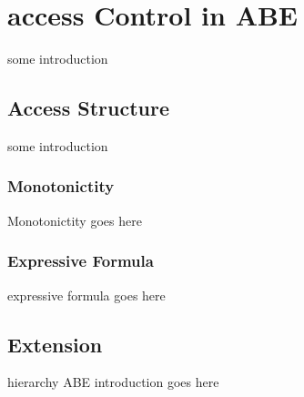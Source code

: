 \section{access Control in ABE}
some introduction
\subsection{Access Structure}
some introduction
\subsubsection{Monotonictity}
Monotonictity goes here
\subsubsection{Expressive Formula}
expressive formula goes here
\subsection{Extension}
hierarchy ABE introduction goes here
